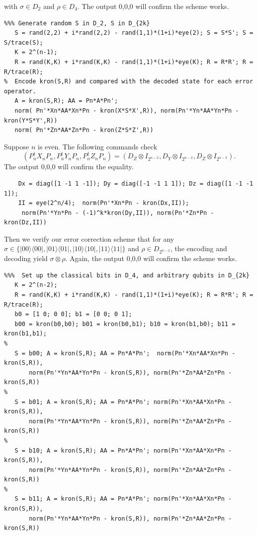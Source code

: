 \documentclass[11pt]{article}
\def\ra{{\rangle}}
\def\la{{\langle}}
\begin{document}
with $\sigma \in D_2$ and $\rho \in D_4$. The output 0,0,0 will confirm the scheme works.
\begin{verbatim}
%%% Generate random S in D_2, S in D_{2k}
   S = rand(2,2) + i*rand(2,2) - rand(1,1)*(1+i)*eye(2); S = S*S'; S = S/trace(S); 
   K = 2^(n-1);    
   R = rand(K,K) + i*rand(K,K) - rand(1,1)*(1+i)*eye(K); R = R*R'; R = R/trace(R);
%  Encode kron(S,R) and compared with the decoded state for each error operator.
   A = kron(S,R); AA = Pn*A*Pn'; 
   norm( Pn'*Xn*AA*Xn*Pn - kron(X*S*X',R)), norm(Pn'*Yn*AA*Yn*Pn - kron(Y*S*Y',R))
   norm( Pn'*Zn*AA*Zn*Pn - kron(Z*S*Z',R))
\end{verbatim}
Suppose $n$ is even. The following commands check
\begin{equation}\label{even}
(P_n^\dag X_n P_n,P_n^\dag Y_n P_n,P_n^\dag Z_n P_n) = 
(D_Z \otimes I_{2^{n-2}},D_Y \otimes I_{2^{n-2}}, D_Z \otimes I_{2^{n-2}}).\end{equation}
The output 0,0,0 will confirm the equality.
\begin{verbatim}
    Dx = diag([1 -1 1 -1]); Dy = diag([-1 -1 1 1]); Dz = diag([1 -1 -1 1]);
    II = eye(2^n/4);  norm(Pn'*Xn*Pn - kron(Dx,II)); 
     norm(Pn'*Yn*Pn - (-1)^k*kron(Dy,II)), norm(Pn'*Zn*Pn - kron(Dz,II))
\end{verbatim}
Then we verify our error correction scheme that for any $\sigma \in \{|00\ra\la 00|,
|01\ra\la 01|,|10\ra\la 10|,|11\ra\la 11|\}$ and $\rho \in D_{2^{n-2}}$,
the encoding and decoding yield $\sigma \otimes \rho$. Again, the output 0,0,0
will confirm the scheme works.
\begin{verbatim}
%%%  Set up the classical bits in D_4, and arbitrary qubits in D_{2k}
   K = 2^(n-2); 
   R = rand(K,K) + i*rand(K,K) - rand(1,1)*(1+i)*eye(K); R = R*R'; R = R/trace(R);
   b0 = [1 0; 0 0]; b1 = [0 0; 0 1]; 
   b00 = kron(b0,b0); b01 = kron(b0,b1); b10 = kron(b1,b0); b11 = kron(b1,b1);
%
   S = b00; A = kron(S,R); AA = Pn*A*Pn';  norm(Pn'*Xn*AA*Xn*Pn - kron(S,R)),
       norm(Pn'*Yn*AA*Yn*Pn - kron(S,R)), norm(Pn'*Zn*AA*Zn*Pn - kron(S,R))
%
   S = b01; A = kron(S,R); AA = Pn*A*Pn'; norm(Pn'*Xn*AA*Xn*Pn - kron(S,R)), 
       norm(Pn'*Yn*AA*Yn*Pn - kron(S,R)), norm(Pn'*Zn*AA*Zn*Pn - kron(S,R))
%
   S = b10; A = kron(S,R); AA = Pn*A*Pn'; norm(Pn'*Xn*AA*Xn*Pn - kron(S,R)), 
       norm(Pn'*Yn*AA*Yn*Pn - kron(S,R)), norm(Pn'*Zn*AA*Zn*Pn - kron(S,R))
%
   S = b11; A = kron(S,R); AA = Pn*A*Pn'; norm(Pn'*Xn*AA*Xn*Pn - kron(S,R)), 
       norm(Pn'*Yn*AA*Yn*Pn - kron(S,R)), norm(Pn'*Zn*AA*Zn*Pn - kron(S,R))
\end{verbatim}
\end{document}
